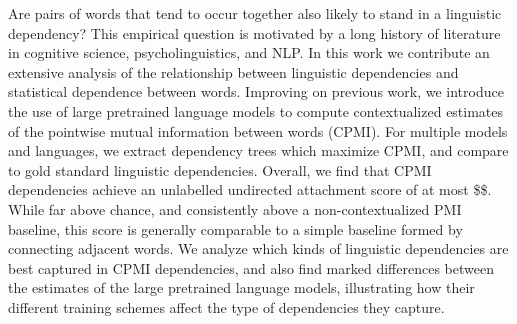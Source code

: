 Are pairs of words that tend to occur together also likely to stand in a linguistic dependency? This empirical question is motivated by a long history of literature in cognitive science, psycholinguistics, and NLP. In this work we contribute an extensive analysis of the relationship between linguistic dependencies and statistical dependence between words. Improving on previous work, we introduce the use of large pretrained language models to compute contextualized estimates of the pointwise mutual information between words (CPMI). For multiple models and languages, we extract dependency trees which maximize CPMI, and compare to gold standard linguistic dependencies.  Overall, we find that CPMI dependencies achieve an unlabelled undirected attachment score of at most \$\$.  While far above chance, and consistently above a non-contextualized PMI baseline, this score is generally comparable to a simple baseline formed by connecting adjacent words.  We analyze which kinds of linguistic dependencies are best captured in CPMI dependencies, and also find marked differences between the estimates of the large pretrained language models, illustrating how their different training schemes affect the type of dependencies they capture.
